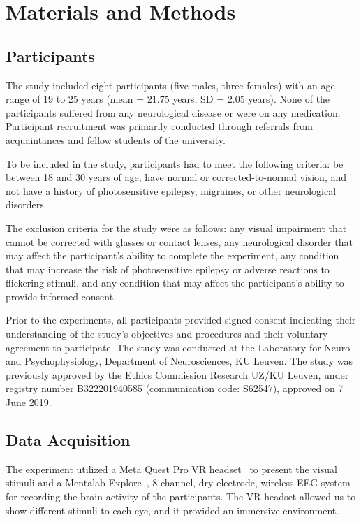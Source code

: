 \chapter{Materials and Methods}
\label{cha:methods}

\section{Participants}
The study included eight participants (five males, three females) with an age range of 19 to 25 years (mean = 21.75 years, SD = 2.05 years). None of the participants suffered from any neurological disease or were on any medication. Participant recruitment was primarily conducted through referrals from acquaintances and fellow students of the university. 

To be included in the study, participants had to meet the following criteria: be between 18 and 30 years of age, have normal or corrected-to-normal vision, and not have a history of photosensitive epilepsy, migraines, or other neurological disorders. 

The exclusion criteria for the study were as follows: any visual impairment that cannot be corrected with glasses or contact lenses, any neurological disorder that may affect the participant's ability to complete the experiment, any condition that may increase the risk of photosensitive epilepsy or adverse reactions to flickering stimuli, and any condition that may affect the participant's ability to provide informed consent. 

Prior to the experiments, all participants provided signed consent indicating their understanding of the study's objectives and procedures and their voluntary agreement to participate. The study was conducted at the Laboratory for Neuro-and Psychophysiology, Department of Neurosciences, KU Leuven. The study was previously approved by the Ethics Commission Research UZ/KU Leuven, under registry number B322201940585 (communication code: S62547), approved on 7 June 2019.

\section{Data Acquisition}
The experiment utilized a Meta Quest Pro VR headset~\cite{meta} to present the visual stimuli and a Mentalab Explore~\cite{mentalab}, 8-channel, dry-electrode, wireless EEG system for recording the  brain activity of the participants. The VR headset allowed us to show different stimuli to each eye, and it provided an immersive environment.

